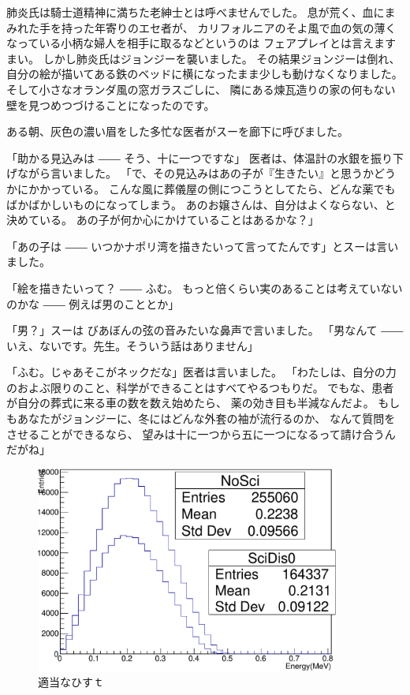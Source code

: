 肺炎氏は騎士道精神に満ちた老紳士とは呼べませんでした。 息が荒く、血にまみれた手を持った年寄りのエセ者が、 カリフォルニアのそよ風で血の気の薄くなっている小柄な婦人を相手に取るなどというのは フェアプレイとは言えますまい。 しかし肺炎氏はジョンジーを襲いました。 その結果ジョンジーは倒れ、 自分の絵が描いてある鉄のベッドに横になったまま少しも動けなくなりました。 そして小さなオランダ風の窓ガラスごしに、 隣にある煉瓦造りの家の何もない壁を見つめつづけることになったのです。

ある朝、灰色の濃い眉をした多忙な医者がスーを廊下に呼びました。

「助かる見込みは ―― そう、十に一つですな」 医者は、体温計の水銀を振り下げながら言いました。 「で、その見込みはあの子が『生きたい』と思うかどうかにかかっている。 こんな風に葬儀屋の側につこうとしてたら、どんな薬でもばかばかしいものになってしまう。 あのお嬢さんは、自分はよくならない、と決めている。 あの子が何か心にかけていることはあるかな？」

「あの子は ―― いつかナポリ湾を描きたいって言ってたんです」とスーは言いました。

「絵を描きたいって？ ―― ふむ。 もっと倍くらい実のあることは考えていないのかな ―― 例えば男のこととか」

「男？」スーは びあぼんの弦の音みたいな鼻声で言いました。 「男なんて ―― いえ、ないです。先生。そういう話はありません」

「ふむ。じゃあそこがネックだな」医者は言いました。 「わたしは、自分の力のおよぶ限りのこと、科学ができることはすべてやるつもりだ。 でもな、患者が自分の葬式に来る車の数を数え始めたら、 薬の効き目も半減なんだよ。 もしもあなたがジョンジーに、冬にはどんな外套の袖が流行るのか、 なんて質問をさせることができるなら、 望みは十に一つから五に一つになるって請け合うんだがね」


\begin{figure}[htbp]
	\centering
		\includegraphics[width=10cm]{fig/figure.pdf}
	\caption{適当なひすｔ}
	\label{picture}
\end{figure}

